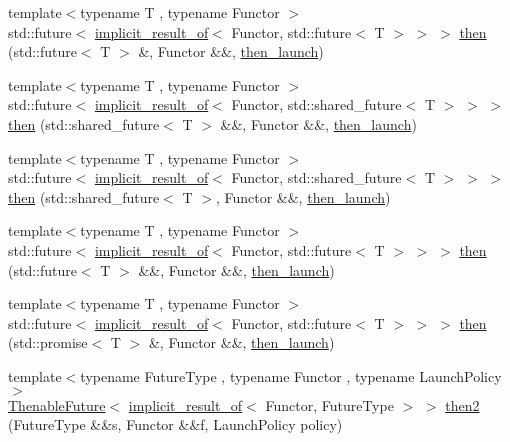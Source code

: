 \begin{DoxyCompactItemize}
\item 
{\footnotesize template$<$typename T , typename Functor $>$ }\\std\+::future$<$ \hyperlink{namespacethenable_a1ecf08d6ad8b8688d7b4df047b5feaae}{implicit\+\_\+result\+\_\+of}$<$ Functor, std\+::future$<$ T $>$ $>$ $>$ \hyperlink{namespacethenable_ab8091f2d67ec80c1f1df9e8f10ed099f}{then} (std\+::future$<$ T $>$ \&, Functor \&\&, \hyperlink{namespacethenable_adf31291b806157ad914943dae5b3c94e}{then\+\_\+launch})
\item 
{\footnotesize template$<$typename T , typename Functor $>$ }\\std\+::future$<$ \hyperlink{namespacethenable_a1ecf08d6ad8b8688d7b4df047b5feaae}{implicit\+\_\+result\+\_\+of}$<$ Functor, std\+::shared\+\_\+future$<$ T $>$ $>$ $>$ \hyperlink{namespacethenable_acdaaca11a1470419997f4b476dcd7f0e}{then} (std\+::shared\+\_\+future$<$ T $>$ \&\&, Functor \&\&, \hyperlink{namespacethenable_adf31291b806157ad914943dae5b3c94e}{then\+\_\+launch})
\item 
{\footnotesize template$<$typename T , typename Functor $>$ }\\std\+::future$<$ \hyperlink{namespacethenable_a1ecf08d6ad8b8688d7b4df047b5feaae}{implicit\+\_\+result\+\_\+of}$<$ Functor, std\+::shared\+\_\+future$<$ T $>$ $>$ $>$ \hyperlink{namespacethenable_a234e54343659f3b576ae0565614d1c64}{then} (std\+::shared\+\_\+future$<$ T $>$, Functor \&\&, \hyperlink{namespacethenable_adf31291b806157ad914943dae5b3c94e}{then\+\_\+launch})
\item 
{\footnotesize template$<$typename T , typename Functor $>$ }\\std\+::future$<$ \hyperlink{namespacethenable_a1ecf08d6ad8b8688d7b4df047b5feaae}{implicit\+\_\+result\+\_\+of}$<$ Functor, std\+::future$<$ T $>$ $>$ $>$ \hyperlink{namespacethenable_aed748177c95e6ae1861c9921bb1c9a84}{then} (std\+::future$<$ T $>$ \&\&, Functor \&\&, \hyperlink{namespacethenable_adf31291b806157ad914943dae5b3c94e}{then\+\_\+launch})
\item 
{\footnotesize template$<$typename T , typename Functor $>$ }\\std\+::future$<$ \hyperlink{namespacethenable_a1ecf08d6ad8b8688d7b4df047b5feaae}{implicit\+\_\+result\+\_\+of}$<$ Functor, std\+::future$<$ T $>$ $>$ $>$ \hyperlink{namespacethenable_aeda63a514e4f56a1be216992fe592ada}{then} (std\+::promise$<$ T $>$ \&, Functor \&\&, \hyperlink{namespacethenable_adf31291b806157ad914943dae5b3c94e}{then\+\_\+launch})
\item 
{\footnotesize template$<$typename Future\+Type , typename Functor , typename Launch\+Policy $>$ }\\\hyperlink{classthenable_1_1_thenable_future}{Thenable\+Future}$<$ \hyperlink{namespacethenable_a1ecf08d6ad8b8688d7b4df047b5feaae}{implicit\+\_\+result\+\_\+of}$<$ Functor, Future\+Type $>$ $>$ \hyperlink{namespacethenable_a80f31095c0a474f5b645c1e00256becf}{then2} (Future\+Type \&\&s, Functor \&\&f, Launch\+Policy policy)

\end{DoxyCompactItemize}
